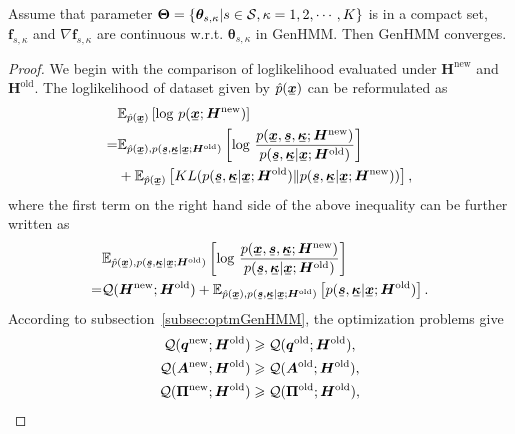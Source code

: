 \begin{proposition}\label{proposition1}
  Assume that parameter $\bm{\Theta} = \left\{ \bm{\theta}_{s,\kappa}| s\in \mathcal{S}, \kappa=1, 2, \cdots, K \right\}$ is in a compact set,  $\bm{f}_{s,\kappa}$ and  ${\nabla\bm{f}_{s,\kappa}}$ are continuous w.r.t. ${\bm\theta}_{s,\kappa}$ in GenHMM. Then GenHMM converges.
\end{proposition}

\begin{proof}
  We begin with the comparison of loglikelihood evaluated under $\bm{H}^{\mathrm{new}}$ and $\bm{H}^{\mathrm{old}}$. The loglikelihood of dataset given by $\hat{p}(\ubm{x})$ can be reformulated as
  \begin{align*}
    &\EE_{\hat{p}(\ubm{x})}\left[ \log\,p(\ubm{x};\bm{H}^{\mathrm{new}}) \right] \nonumber \\
    =& \EE_{\hat{p}(\ubm{x}),p(\ubm{s},\ubm{\kappa}| \ubm{x}; \bm{H}^{\mathrm{old}})}\left[ \log\,\frac{p(\ubm{x}, \ubm{s}, \ubm{\kappa}; \bm{H}^{\mathrm{new}})}{p(\ubm{s}, \ubm{\kappa}|\ubm{x}; \bm{H}^{\mathrm{old}})}\right]  \nonumber \\
    & +\EE_{\hat{p}(\ubm{x})}\left[ KL(p(\ubm{s}, \ubm{\kappa}|\ubm{x}; \bm{H}^{\mathrm{old}})\|p(\ubm{s}, \ubm{\kappa}|\ubm{x}; \bm{H}^{\mathrm{new}})) \right],
  \end{align*}
  where the first term on the right hand side of the above inequality can be further written as
  \begin{align*}
    &\EE_{\hat{p}(\ubm{x}),p(\ubm{s},\ubm{\kappa}| \ubm{x}; \bm{H}^{\mathrm{old}})}\left[ \log\,\frac{p(\ubm{x}, \ubm{s}, \ubm{\kappa}; \bm{H}^{\mathrm{new}})}{p(\ubm{s}, \ubm{\kappa}|\ubm{x}; \bm{H}^{\mathrm{old}})}\right] \nonumber \\
    = &\Qq(\bm{H}^{\mathrm{new}}; \bm{H}^{\mathrm{old}}) + \EE_{\hat{p}(\ubm{x}),p(\ubm{s},\ubm{\kappa}| \ubm{x}; \bm{H}^{\mathrm{old}})}\left[p(\ubm{s}, \ubm{\kappa}|\ubm{x}; \bm{H}^{\mathrm{old}})\right].
  \end{align*}
  According to subsection~\ref{subsec:optmGenHMM}, the optimization problems give
  \begin{align*}
    \Qq(\bm{q}^{\mathrm{new}}; \bm{H}^{\mathrm{old}}) &\geq \Qq(\bm{q}^{\mathrm{old}}; \bm{H}^{\mathrm{old}}),\nonumber \\
    \Qq(\bm{A}^{\mathrm{new}}; \bm{H}^{\mathrm{old}}) &\geq \Qq(\bm{A}^{\mathrm{old}}; \bm{H}^{\mathrm{old}}),\nonumber \\
    \Qq(\bm{\Pi}^{\mathrm{new}}; \bm{H}^{\mathrm{old}}) &\geq \Qq(\bm{\Pi}^{\mathrm{old}}; \bm{H}^{\mathrm{old}}), \nonumber \\

\end{align*}
\end{proof}
